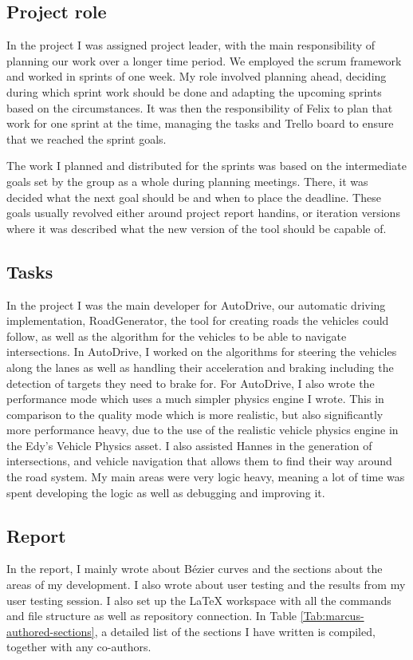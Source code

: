 

\subsection{Project role}
    In the project I was assigned project leader, with the main responsibility of planning our work over a longer time period. We employed the scrum framework and worked in sprints of one week. My role involved planning ahead, deciding during which sprint work should be done and adapting the upcoming sprints based on the circumstances. It was then the responsibility of Felix to plan that work for one sprint at the time, managing the tasks and Trello board to ensure that we reached the sprint goals.

    The work I planned and distributed for the sprints was based on the intermediate goals set by the group as a whole during planning meetings. There, it was decided what the next goal should be and when to place the deadline. These goals usually revolved either around project report handins, or iteration versions where it was described what the new version of the tool should be capable of.
    
\subsection{Tasks}
    In the project I was the main developer for AutoDrive, our automatic driving implementation, RoadGenerator, the tool for creating roads the vehicles could follow, as well as the algorithm for the vehicles to be able to navigate intersections. In AutoDrive, I worked on the algorithms for steering the vehicles along the lanes as well as handling their acceleration and braking including the detection of targets they need to brake for. For AutoDrive, I also wrote the performance mode which uses a much simpler physics engine I wrote. This in comparison to the quality mode which is more realistic, but also significantly more performance heavy, due to the use of the realistic vehicle physics engine in the Edy's Vehicle Physics asset. I also assisted Hannes in the generation of intersections, and vehicle navigation that allows them to find their way around the road system. My main areas were very logic heavy, meaning a lot of time was spent developing the logic as well as debugging and improving it. 

\subsection{Report}
    In the report, I mainly wrote about Bézier curves and the sections about the areas of my development. I also wrote about user testing and the results from my user testing session. I also set up the LaTeX workspace with all the commands and file structure as well as repository connection. In Table \ref{Tab:marcus-authored-sections}, a detailed list of the sections I have written is compiled, together with any co-authors.

